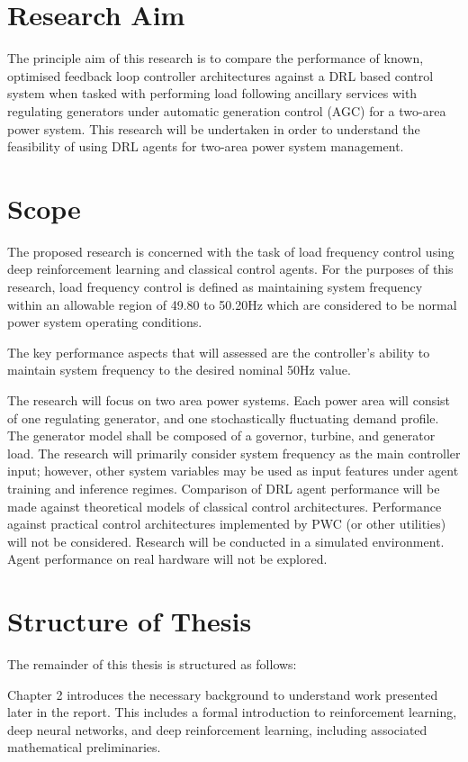 \section{Research Aim}
The principle aim of this research is to compare the performance of known, optimised feedback loop controller architectures against a DRL based control system when tasked with performing load following ancillary services with regulating generators under automatic generation control (AGC) for a two-area power system. This research will be undertaken in order to understand the feasibility of using DRL agents for two-area power system management.

\section{Scope}
The proposed research is concerned with the task of load frequency control using deep reinforcement learning and classical control agents. For the purposes of this research, load frequency control is defined as maintaining system frequency within an allowable region of 49.80 to 50.20$\si{\hertz}$ which are considered to be normal power system operating conditions.

The key performance aspects that will assessed are the controller's ability to maintain system frequency to the desired nominal 50$\si{\hertz}$ value.

The research will focus on two area power systems. Each power area will consist of one regulating generator, and one stochastically fluctuating demand profile. The generator model shall be composed of a governor, turbine, and generator load. The research will primarily consider system frequency as the main controller input; however, other system variables may be used as input features under agent training and inference regimes. Comparison of DRL agent performance will be made against theoretical models of classical control architectures. Performance against practical control architectures implemented by PWC (or other utilities) will not be considered. Research will be conducted in a simulated environment. Agent performance on real hardware will not be explored.

\section{Structure of Thesis}
The remainder of this thesis is structured as follows:

Chapter 2 introduces the necessary background to understand work presented later in the report. This includes a formal introduction to reinforcement learning, deep neural networks, and deep reinforcement learning, including associated mathematical preliminaries.

